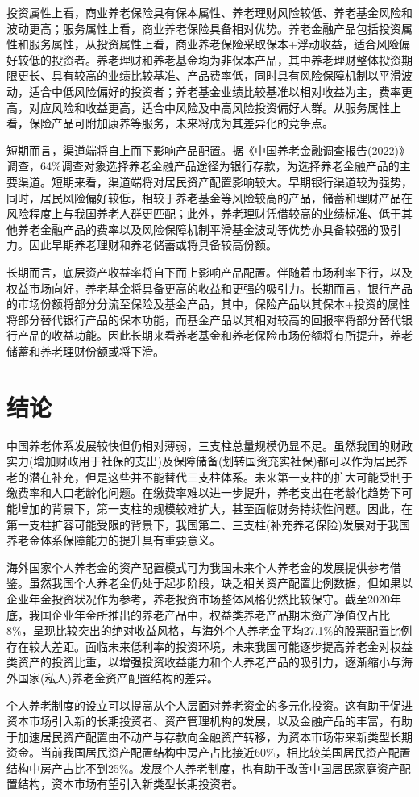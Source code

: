 \documentclass[a4paper,zihao=5]{ctexart}
\begin{document}
投资属性上看，商业养老保险具有保本属性、养老理财风险较低、养老基金风险和波动更高；服务属性上看，商业养老保险具备相对优势。养老金融产品包括投资属性和服务属性，从投资属性上看，商业养老保险采取保本+浮动收益，适合风险偏好较低的投资者。养老理财和养老基金均为非保本产品，其中养老理财整体投资期限更长、具有较高的业绩比较基准、产品费率低，同时具有风险保障机制以平滑波动，适合中低风险偏好的投资者；养老基金业绩比较基准以相对收益为主，费率更高，对应风险和收益更高，适合中风险及中高风险投资偏好人群。从服务属性上看，保险产品可附加康养等服务，未来将成为其差异化的竞争点。

短期而言，渠道端将自上而下影响产品配置。据《中国养老金融调查报告(2022)》调查，64\%调查对象选择养老金融产品途径为银行存款，为选择养老金融产品的主要渠道。短期来看，渠道端将对居民资产配置影响较大。早期银行渠道较为强势，同时，居民风险偏好较低，相较于养老基金等风险较高的产品，储蓄和理财产品在风险程度上与我国养老人群更匹配；此外，养老理财凭借较高的业绩标准、低于其他养老金融产品的费率以及风险保障机制平滑基金波动等优势亦具备较强的吸引力。因此早期养老理财和养老储蓄或将具备较高份额。

长期而言，底层资产收益率将自下而上影响产品配置。伴随着市场利率下行，以及权益市场向好，养老基金将具备更高的收益和更强的吸引力。长期而言，银行产品的市场份额将部分分流至保险及基金产品，其中，保险产品以其保本+投资的属性将部分替代银行产品的保本功能，而基金产品以其相对较高的回报率将部分替代银行产品的收益功能。因此长期来看养老基金和养老保险市场份额将有所提升，养老储蓄和养老理财份额或将下滑。

\section{结论}
中国养老体系发展较快但仍相对薄弱，三支柱总量规模仍显不足。虽然我国的财政实力(增加财政用于社保的支出)及保障储备(划转国资充实社保)都可以作为居民养老的潜在补充，但是这些并不能替代三支柱体系。未来第一支柱的扩大可能受制于缴费率和人口老龄化问题。在缴费率难以进一步提升，养老支出在老龄化趋势下可能增加的背景下，第一支柱的规模较难扩大，甚至面临财务持续性问题。因此，在第一支柱扩容可能受限的背景下，我国第二、三支柱(补充养老保险)发展对于我国养老金体系保障能力的提升具有重要意义。

海外国家个人养老金的资产配置模式可为我国未来个人养老金的发展提供参考借鉴。虽然我国个人养老金仍处于起步阶段，缺乏相关资产配置比例数据，但如果以企业年金投资状况作为参考，养老投资市场整体风格仍然比较保守。截至2020年底，我国企业年金所推出的养老产品中，权益类养老产品期末资产净值仅占比8\%，呈现比较突出的绝对收益风格，与海外个人养老金平均27.1\%的股票配置比例存在较大差距。面临未来低利率的投资环境，未来我国可能逐步提高养老金对权益类资产的投资比重，以增强投资收益能力和个人养老产品的吸引力，逐渐缩小与海外国家(私人)养老金资产配置结构的差异。

个人养老制度的设立可以提高从个人层面对养老资金的多元化投资。这有助于促进资本市场引入新的长期投资者、资产管理机构的发展，以及金融产品的丰富，有助于加速居民资产配置由不动产与存款向金融资产转移，为资本市场带来新类型长期资金。当前我国居民资产配置结构中房产占比接近60\%，相比较美国居民资产配置结构中房产占比不到25\%。发展个人养老制度，也有助于改善中国居民家庭资产配置结构，资本市场有望引入新类型长期投资者。

\clearpage
\appendix
\nocite{*}
\end{document}
